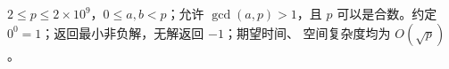 $2\le p\le 2\times 10^9$，$0\le a,b<p$；允许 $\gcd(a,p)>1$，且 $p$
可以是合数。约定 $0^0=1$；返回最小非负解，无解返回 $-1$；期望时间、
空间复杂度均为 $O(\sqrt p)$。
